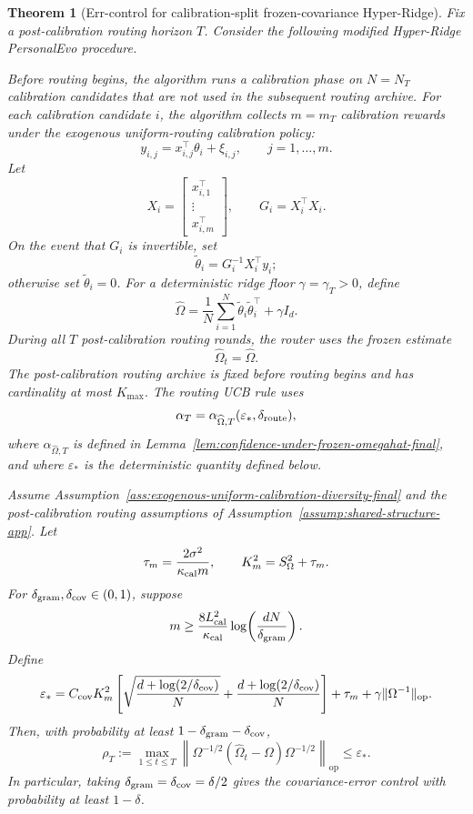 \documentclass{article} %
\newtheorem{theorem}{Theorem}
\begin{document}
\begin{theorem}[Err-control for calibration-split frozen-covariance Hyper-Ridge]
\label{thm:err-control-calibration-split-final}
Fix a post-calibration routing horizon \(T\).  Consider the following modified
Hyper-Ridge PersonalEvo procedure.

Before routing begins, the algorithm runs a calibration phase on
\(N=N_T\) calibration candidates that are not used in the subsequent routing
archive.  For each calibration candidate \(i\), the algorithm collects
\(m=m_T\) calibration rewards under the exogenous uniform-routing calibration
policy:
\[
y_{i,j}=x_{i,j}^{\top}\theta_i+\xi_{i,j},
\qquad j=1,\ldots,m.
\]
Let
\[
X_i=
\begin{bmatrix}
x_{i,1}^{\top}\\
\vdots\\
x_{i,m}^{\top}
\end{bmatrix},
\qquad
G_i=X_i^\top X_i.
\]
On the event that \(G_i\) is invertible, set
\[
\widetilde\theta_i=G_i^{-1}X_i^\top y_i;
\]
otherwise set \(\widetilde\theta_i=0\).  For a deterministic ridge floor
\(\gamma=\gamma_T>0\), define
\[
\widehat\Omega
=
\frac1N\sum_{i=1}^N\widetilde\theta_i\widetilde\theta_i^\top+\gamma I_d.
\]
During all \(T\) post-calibration routing rounds, the router uses the frozen
estimate
\[
\widehat\Omega_t=\widehat\Omega.
\]
The post-calibration routing archive is fixed before routing begins and has
cardinality at most \(K_{\max}\).  The routing UCB rule uses
\[
\alpha_T
=
\alpha_{\widehat\Omega,T}(\varepsilon_*,\delta_{\rm route}),
\]
where \(\alpha_{\widehat\Omega,T}\) is defined in
Lemma~\ref{lem:confidence-under-frozen-omegahat-final}, and where
\(\varepsilon_*\) is the deterministic quantity defined below.

Assume Assumption~\ref{ass:exogenous-uniform-calibration-diversity-final} and
the post-calibration routing assumptions of
Assumption~\ref{assump:shared-structure-app}.  Let
\[
\tau_m=\frac{2\sigma^2}{\kappa_{\rm cal}m},
\qquad
K_m^2=S_\Omega^2+\tau_m.
\]
For \(\delta_{\rm gram},\delta_{\rm cov}\in(0,1)\), suppose
\[
m
\ge
\frac{8L_{\rm cal}^2}{\kappa_{\rm cal}}
\log\!\left(\frac{dN}{\delta_{\rm gram}}\right).
\]
Define
\[
\varepsilon_*
=
C_{\rm cov}K_m^2
\left[
\sqrt{\frac{d+\log(2/\delta_{\rm cov})}{N}}
+
\frac{d+\log(2/\delta_{\rm cov})}{N}
\right]
+
\tau_m
+
\gamma\|\Omega^{-1}\|_{\mathrm{op}}.
\]
Then, with probability at least
\(1-\delta_{\rm gram}-\delta_{\rm cov}\),
\[
\rho_T
:=
\max_{1\le t\le T}
\left\|
\Omega^{-1/2}(\widehat\Omega_t-\Omega)\Omega^{-1/2}
\right\|_{\mathrm{op}}
\le
\varepsilon_*.
\]
In particular, taking \(\delta_{\rm gram}=\delta_{\rm cov}=\delta/2\) gives the
covariance-error control with probability at least \(1-\delta\).


\end{theorem}
\end{document}
